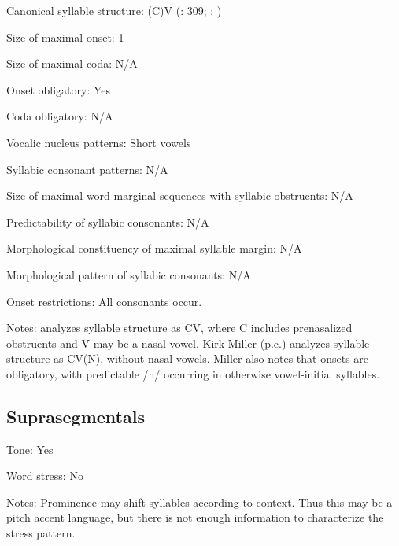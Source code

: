 {\begin{appendixdesc}
\item[Canonical syllable structure:] (C)V (\citealt{TuckerEtAl1977}: 309; \citealt{SandsEtAl1996}; \citealt{Sands2013})

\item[Size of maximal onset:] 1

\item[Size of maximal coda:] N/A

\item[Onset obligatory:] Yes

\item[Coda obligatory:] N/A

\item[Vocalic nucleus patterns:] Short vowels

\item[Syllabic consonant patterns:] N/A

\item[Size of maximal word-marginal sequences with syllabic obstruents:] N/A

\item[Predictability of syllabic consonants:] N/A

\item[Morphological constituency of maximal syllable margin:] N/A

\item[Morphological pattern of syllabic consonants:] N/A

\item[Onset restrictions:] All consonants occur.

\item[Notes:] \citet{Sands2013} analyzes syllable structure as CV, where C includes prenasalized obstruents and V may be a nasal vowel. Kirk Miller (p.c.) analyzes syllable structure as CV(N), without nasal vowels. Miller also notes that onsets are obligatory, with predictable /h/ occurring in otherwise vowel-initial syllables.
\end{appendixdesc}
\subsection*{Suprasegmentals}
\begin{appendixdesc}
\item[Tone:] Yes

\item[Word stress:] No

\item[Notes:] Prominence may shift syllables according to context. Thus this may be a pitch accent language, but there is not enough information to characterize the stress pattern.
\end{appendixdesc}
}
